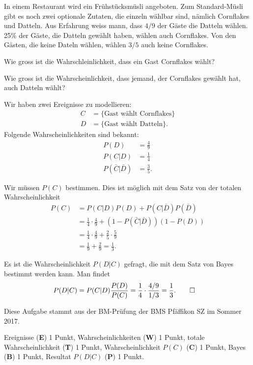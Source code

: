 In einem Restaurant wird ein Frühstücksmüsli angeboten.
Zum Standard-Müsli gibt es noch zwei optionale Zutaten, die einzeln
wählbar sind, nämlich Cornflakes und Datteln.
Aus Erfahrung weiss mann, dass $4/9$ der Gäste die
Datteln wählen.
25\% der Gäste, die Datteln gewählt haben, wählen auch Cornflakes.
Von den Gästen, die keine Dateln wählen, wählen $3/5$ auch keine Cornflakes.

\begin{teilaufgaben}
\item Wie gross ist die Wahrschleinlichkeit, dass ein Gast Cornflakes wählt?
\item Wie gross ist die Wahrscheinlichkeit, dass jemand, der Cornflakes
gewählt hat, auch Datteln wählt?
\end{teilaufgaben}


\begin{loesung}
Wir haben zwei Ereignisse zu modellieren:
\begin{align*}
C
&=
\{\text{Gast wählt Cornflakes}\}
\\
D
&=
\{\text{Gast wählt Datteln}\}.
\end{align*}
Folgende Wahrscheinlichkeiten sind bekannt:
\begin{align*}
P(D)
&=
\frac49
\\
P(C|D)
&=
\frac14
\\
P(\bar C|\bar D)
&=
\frac35.
\end{align*}
\begin{teilaufgaben}
\item Wir müssen $P(C)$ bestimmen.
Dies ist möglich mit dem Satz von der totalen Wahrscheinlichkeit
\begin{align*}
P(C)
&=
P(C|D)P(D) + P(C|\bar D)P(\bar D)
\\
&=
\frac14\cdot \frac49 + (1-P(\bar C|\bar D))(1-P(D))
\\
&=
\frac14\cdot \frac49 + \frac25 \cdot\frac59
\\
&=
\frac19 +\frac29=\frac13.
\end{align*}
\item
Es ist die Wahrscheinlichkeit $P(D|C)$ gefragt, die mit dem Satz von Bayes
bestimmt werden kann.
Man findet
\begin{align*}
P(D|C)
&=
P(C|D)\frac{P(D)}{P(C)}
=
\frac14\cdot\frac{4/9}{1/3}=\frac13.
\qedhere
\end{align*}
\end{teilaufgaben}
\end{loesung}

\begin{diskussion}
Diese Aufgabe stammt aus der BM-Prüfung der BMS Pfäffikon SZ im Sommer 2017.
\end{diskussion}

\begin{bewertung}
Ereignisse ({\bf E}) 1 Punkt,
Wahrscheinlichkeiten ({\bf W}) 1 Punkt,
totale Wahrscheinlichkeit ({\bf T}) 1 Punkt,
Wahrscheinlichkeit $P(C)$ ({\bf C}) 1 Punkt,
Bayes ({\bf B}) 1 Punkt,
Resultat $P(D|C)$ ({\bf P}) 1 Punkt.
\end{bewertung}

